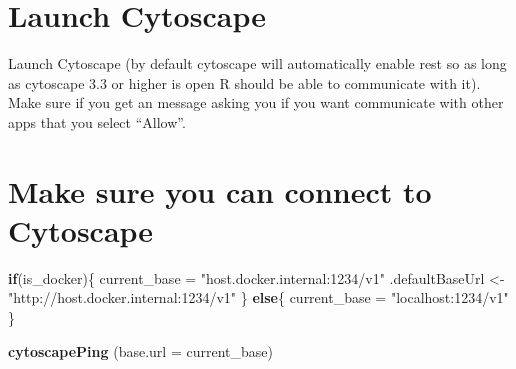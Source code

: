 \documentclass[
]{book}
\newenvironment{Shaded}{\begin{snugshade}}{\end{snugshade}}
\newcommand{\AttributeTok}[1]{\textcolor[rgb]{0.13,0.29,0.53}{#1}}
\newcommand{\CommentTok}[1]{\textcolor[rgb]{0.56,0.35,0.01}{\textit{#1}}}
\newcommand{\ControlFlowTok}[1]{\textcolor[rgb]{0.13,0.29,0.53}{\textbf{#1}}}
\newcommand{\FunctionTok}[1]{\textcolor[rgb]{0.13,0.29,0.53}{\textbf{#1}}}
\newcommand{\NormalTok}[1]{#1}
\newcommand{\OtherTok}[1]{\textcolor[rgb]{0.56,0.35,0.01}{#1}}
\newcommand{\SpecialCharTok}[1]{\textcolor[rgb]{0.81,0.36,0.00}{\textbf{#1}}}
\newcommand{\StringTok}[1]{\textcolor[rgb]{0.31,0.60,0.02}{#1}}
\begin{document}
\begin{Shaded}
\end{Shaded}

\section{Launch Cytoscape}\label{launch-cytoscape-1}

Launch Cytoscape (by default cytoscape will automatically enable rest so as long as cytoscape 3.3 or higher is open R should be able to communicate with it). Make sure if you get an message asking you if you want communicate with other apps that you select ``Allow''.

\section{Make sure you can connect to Cytoscape}\label{make-sure-you-can-connect-to-cytoscape-1}

\begin{Shaded}
\begin{Highlighting}[]
\ControlFlowTok{if}\NormalTok{(is\_docker)\{}
\NormalTok{  current\_base }\OtherTok{=} \StringTok{"host.docker.internal:1234/v1"}
\NormalTok{  .defaultBaseUrl }\OtherTok{\textless{}{-}} \StringTok{"http://host.docker.internal:1234/v1"}
\NormalTok{\} }\ControlFlowTok{else}\NormalTok{\{}
\NormalTok{  current\_base }\OtherTok{=} \StringTok{"localhost:1234/v1"}
\NormalTok{\}}

\FunctionTok{cytoscapePing}\NormalTok{ (}\AttributeTok{base.url =}\NormalTok{ current\_base)}
\end{Highlighting}
\end{Shaded}
\end{document}
